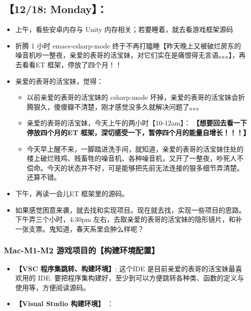 \documentclass[9pt, b5paper]{article}
\begin{document}
\subsection{【12/18: Monday】：}
\label{sec-2-1}
\begin{itemize}
\item 上午，看些安卓内存与 Unity 内存相关；若要睡着，就去看游戏框架源码
\item 折腾 1 小时 emacs-csharp-mode 终于不再打瞌睡【昨天晚上又被破烂房东的噪音机吵一整夜，亲爱的表哥的活宝妹，对它们实在是痛恨得无言语。。。】，再去看看ET 框架，停放了四个月！！
\item 亲爱的表哥的活宝妹，觉得：
\begin{itemize}
\item 以前亲爱的表哥的活宝妹的 csharp-mode 坏掉，亲爱的表哥的活宝妹会折腾狠久，傻傻瓣不清楚，刚才感觉没多久就解决问题了。。。
\item 亲爱的表哥的活宝妹，今天上午的两小时【10-12am】： \textbf{【想要回去看一下停放四个月的ET 框架，深切感受一下，暂停四个月的能量自增长！！！】}
\item 今天早上醒不来，一脚踏进洗手间，就知道，亲爱的表哥的活宝妹住处的楼上破烂贱鸡、贱畜牲的噪音机、各种噪音机，又开了一整夜，吵死人不偿命。今天的状态并不好，可是能够把先前无法连接的狠多细节弄清楚。还算不错。
\end{itemize}
\item 下午，再读一会儿ET 框架里的源码。
\item 如果感觉困意来袭，就去找和实现项目。现在就去找，实现一些项目的思路。下午弄三个小时，4:30pm 左右，去取亲爱的表哥的活宝妹的隐形镜片，和补一张支票。鬼知道，春天系里会肿么样呢？
\end{itemize}
\subsubsection{Mac-M1-M2 游戏项目的【构建环境配置】}
\label{sec-2-1-1}
\begin{itemize}
\item \textbf{【VSC 程序集跳转、构建环境】}: 这个IDE 是目前亲爱的表哥的活宝妹最喜欢用的 IDE. 要把程序集构建好，至少到可以方便跳转各种类、函数的定义与使用等，方便阅读源码。
\item \textbf{【Visual Studio 构建环境】} ：
\end{itemize}
\end{document}

